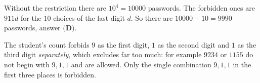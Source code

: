 Without the restriction there are $10^4=10000$ passwords. The forbidden ones are $911d$ for the $10$ choices of the last digit $d$. So there are $10000-10=\boxed{9990}$ passwords, answer $\textbf{(D)}$.

The student's count forbids $9$ as the first digit, $1$ as the second digit and $1$ as the third digit \emph{separately}, which excludes far too much: for example $9234$ or $1155$ do not begin with $9,1,1$ and are allowed. Only the single combination $9,1,1$ in the first three places is forbidden.

